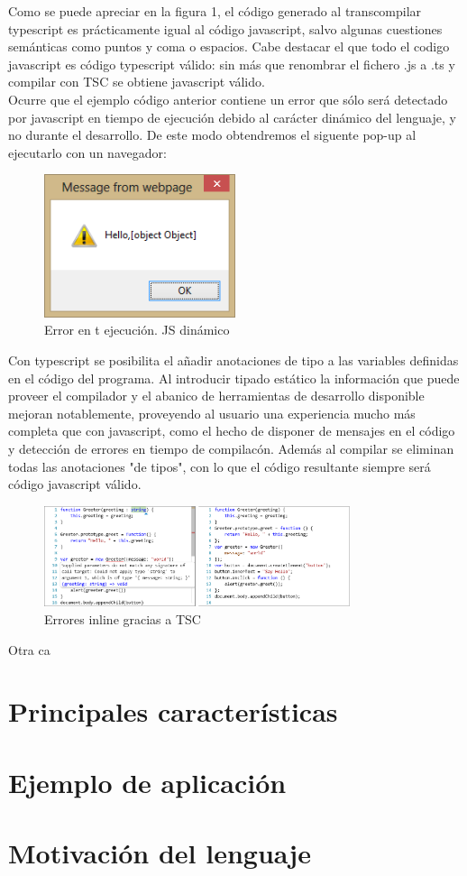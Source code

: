 \documentclass[12pt,twoside,a4paper, spanish]{article}
\begin{document}
	Como se puede apreciar en la figura 1, el código generado al transcompilar typescript es prácticamente igual al código javascript, salvo algunas cuestiones semánticas como puntos y coma o espacios. Cabe destacar el que todo el codigo javascript es código typescript válido: sin más que renombrar el fichero .js a .ts y compilar con TSC se obtiene javascript válido. \\
	
	Ocurre que el ejemplo código anterior contiene un error que sólo será detectado por javascript en tiempo de ejecución debido al carácter dinámico del lenguaje, y no durante el desarrollo. De este modo obtendremos el siguente pop-up al ejecutarlo con un navegador:
	
	\begin{figure}[h]
		\centering
		\includegraphics[width=0.5\textwidth]{imagenes/ts4.png}
		\caption{Error en t ejecución. JS dinámico}
	\end{figure}

	Con typescript se posibilita el añadir anotaciones de tipo a las variables definidas
	en el código del programa. Al introducir tipado estático la información que puede proveer el compilador y el abanico de herramientas de desarrollo disponible mejoran notablemente, proveyendo al usuario una experiencia mucho más completa que con javascript, como el hecho de disponer de mensajes en el código y detección de errores en tiempo de compilacón. Además al compilar se eliminan todas las anotaciones "de tipos", con lo que el código resultante siempre será código javascript válido.
	
	\begin{figure}[h]
		\centering
		\includegraphics[width=0.8\textwidth]{imagenes/ts5.png}
		\caption{Errores inline gracias a TSC}
	\end{figure}

	Otra ca
    
    \section{Principales características}
    
    
    \section{Ejemplo de aplicación}
    
    
    \section{Motivación del lenguaje}
    

	
\end{document}
